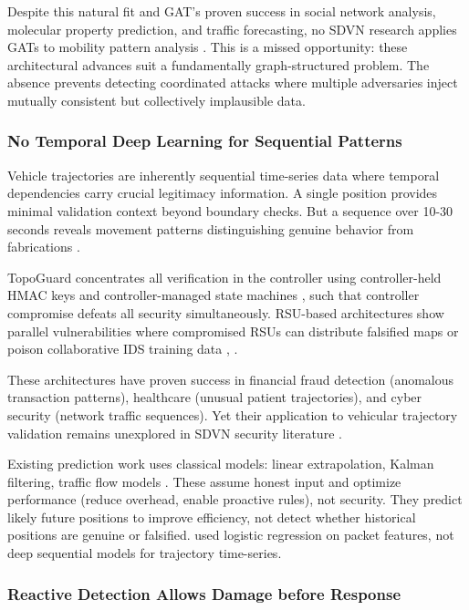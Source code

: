 \documentclass[12pt, a4paper]{report}
\begin{document}
Despite this natural fit and GAT's proven success in social network analysis, molecular property prediction, and traffic forecasting, no SDVN research applies GATs to mobility pattern analysis \cite{bhatia2019,ravi2023}. This is a missed opportunity: these architectural advances suit a fundamentally graph-structured problem. The absence prevents detecting coordinated attacks where multiple adversaries inject mutually consistent but collectively implausible data.

\subsubsection{No Temporal Deep Learning for Sequential Patterns}
\label{subsec:no-temporal-dl}

Vehicle trajectories are inherently sequential time-series data where temporal dependencies carry crucial legitimacy information. A single position provides minimal validation context beyond boundary checks. But a sequence over 10-30 seconds reveals movement patterns distinguishing genuine behavior from fabrications \cite{ghaleb2014,he2016}.

TopoGuard concentrates all verification in the controller using controller-held HMAC keys and controller-managed state machines \cite{hong2015}, such that controller compromise defeats all security simultaneously. RSU-based architectures show parallel vulnerabilities where compromised RSUs can distribute falsified maps or poison collaborative IDS training data \cite{raja2021}, \cite{ghaleb2014}.

These architectures have proven success in financial fraud detection (anomalous transaction patterns), healthcare (unusual patient trajectories), and cyber security (network traffic sequences). Yet their application to vehicular trajectory validation remains unexplored in SDVN security literature \cite{bhatia2019,ravi2023}.

Existing prediction work uses classical models: linear extrapolation, Kalman filtering, traffic flow models \cite{he2016}. These assume honest input and optimize performance (reduce overhead, enable proactive rules), not security. They predict likely future positions to improve efficiency, not detect whether historical positions are genuine or falsified. \cite{raja2021} used logistic regression on packet features, not deep sequential models for trajectory time-series.

\subsubsection{Reactive Detection Allows Damage before Response}
\label{subsec:reactive-detection}
\end{document}

